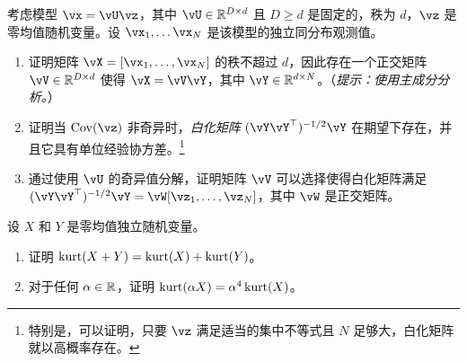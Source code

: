\documentclass[../../book-main.tex]{subfiles}
\begin{document}
\begin{exercise}\label{exercise:whitening}
    考虑模型 $\vx = \vU \vz$，其中 $\vU \in \R^{D \times d}$ 且 $D \geq d$ 是固定的，秩为 $d$，$\vz$ 是零均值随机变量。设 $\vx_1, \dots \vx_N$ 是该模型的独立同分布观测值。
    \begin{enumerate}
        \item 证明矩阵 $\vX = [\vx_1, \dots, \vx_N]$ 的秩不超过 $d$，因此存在一个正交矩阵 $\vV \in \R^{D \times d}$ 使得 $\vX = \vV \vY$，其中 $\vY \in \R^{d \times N}$。（\textit{提示：使用主成分分析。}）
        \item 证明当 $\Cov(\vz)$ 非奇异时，\textit{白化矩阵} $(\vY \vY^\top)^{-1/2}\vY$ 在期望下存在，并且它具有单位经验协方差。\footnote{特别是，可以证明，只要 $\vz$ 满足适当的集中不等式且 $N$ 足够大，白化矩阵就以高概率存在。}
        \item 通过使用 $\vU$ 的奇异值分解，证明矩阵 $\vV$ 可以选择使得白化矩阵满足 $(\vY \vY^\top)^{-1/2} \vY = \vW [\vz_1, \dots, \vz_N]$，其中 $\vW$ 是正交矩阵。
    \end{enumerate}
\end{exercise}

\begin{exercise}\label{exercise:kurtosis-linearity-properties}
    设 $X$ 和 $Y$ 是零均值独立随机变量。
    \begin{enumerate}
        \item 证明 $\mathop{\mathrm{kurt}}(X + Y) = \mathop{\mathrm{kurt}}(X) + \mathop{\mathrm{kurt}}(Y)$。
        \item 对于任何 $\alpha \in \mathbb{R}$，证明 $\mathop{\mathrm{kurt}}(\alpha X) = \alpha^4 \mathop{\mathrm{kurt}}(X)$。
    \end{enumerate}
\end{exercise}
\end{document}
